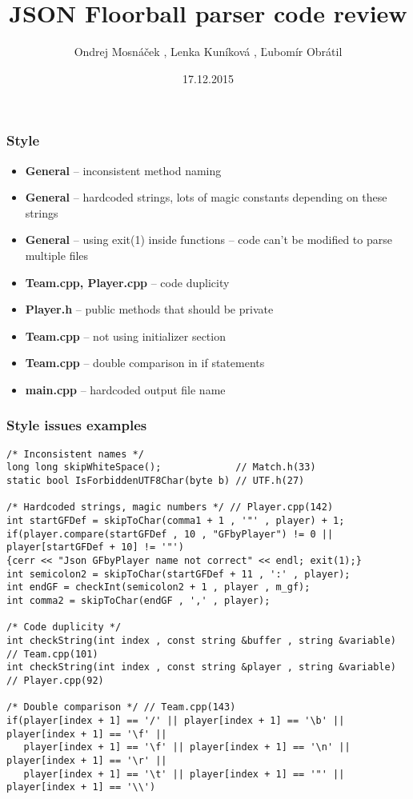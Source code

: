 \documentclass{beamer}
\title[Team P code review]{JSON Floorball parser code review} %
\author[R Team]{Ondrej Mosnáček , Lenka Kuníková , Ľubomír Obrátil} %
\date{17.12.2015} %
\begin{document}
\begin{frame}
\titlepage %
\end{frame}


\begin{frame}
\frametitle{Style}

\begin{itemize}
\item \textbf{General} -- inconsistent method naming
\item \textbf{General} -- hardcoded strings, lots of magic constants depending on these strings
\item \textbf{General} -- using exit(1) inside functions -- code can't be modified to parse multiple files
\item \textbf{Team.cpp, Player.cpp} -- code duplicity
\item \textbf{Player.h} -- public methods that should be private
\item \textbf{Team.cpp} -- not using initializer section
\item \textbf{Team.cpp} -- double comparison in if statements
\item \textbf{main.cpp} -- hardcoded output file name
\end{itemize}

\end{frame}


\begin{frame}[fragile]
\frametitle{Style issues examples}

\begin{lstlisting}
/* Inconsistent names */
long long skipWhiteSpace();             // Match.h(33)
static bool IsForbiddenUTF8Char(byte b) // UTF.h(27)

/* Hardcoded strings, magic numbers */ // Player.cpp(142)
int startGFDef = skipToChar(comma1 + 1 , '"' , player) + 1; 
if(player.compare(startGFDef , 10 , "GFbyPlayer") != 0 || player[startGFDef + 10] != '"')
{cerr << "Json GFbyPlayer name not correct" << endl; exit(1);}
int semicolon2 = skipToChar(startGFDef + 11 , ':' , player);
int endGF = checkInt(semicolon2 + 1 , player , m_gf);
int comma2 = skipToChar(endGF , ',' , player);

/* Code duplicity */
int checkString(int index , const string &buffer , string &variable) // Team.cpp(101)
int checkString(int index , const string &player , string &variable) // Player.cpp(92)

/* Double comparison */ // Team.cpp(143)
if(player[index + 1] == '/' || player[index + 1] == '\b' || player[index + 1] == '\f' ||  
   player[index + 1] == '\f' || player[index + 1] == '\n' || player[index + 1] == '\r' ||
   player[index + 1] == '\t' || player[index + 1] == '"' || player[index + 1] == '\\')
\end{lstlisting}

\end{frame}
\end{document}
